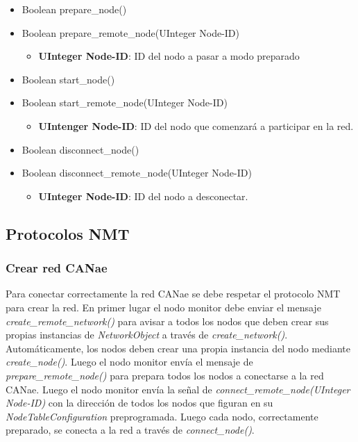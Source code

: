 \begin{itemize}
\item Boolean prepare\_node()
\item Boolean prepare\_remote\_node(UInteger Node-ID)
  \begin{itemize}
   \item \textbf{UInteger Node-ID}: ID del nodo a pasar a modo preparado
  \end{itemize}
\item Boolean start\_node()
\item Boolean start\_remote\_node(UInteger Node-ID)
  \begin{itemize}
    \item \textbf{UIntenger Node-ID}: ID del nodo que comenzará a participar en la red.
   \end{itemize}
\item Boolean disconnect\_node()
\item Boolean disconnect\_remote\_node(UInteger Node-ID)
  \begin{itemize}
    \item \textbf{UInteger Node-ID}: ID del nodo a desconectar.
  \end{itemize}
\end{itemize}

\subsection{Protocolos NMT}
\subsubsection{Crear red CANae}
Para conectar correctamente la red CANae se debe respetar el protocolo NMT para crear la red.
En primer lugar el nodo monitor debe enviar el mensaje \textit{create\_remote\_network()}
para avisar a todos los nodos que deben crear sus propias instancias de
\textit{NetworkObject} a través de \textit{create\_network()}. Automáticamente, los nodos deben crear una propia instancia del nodo mediante
\textit{create\_node()}. Luego el nodo monitor envía el mensaje de
\textit{prepare\_remote\_node()} para prepara todos los nodos a conectarse a la red CANae.
Luego el nodo monitor envía la señal de \textit{connect\_remote\_node(UInteger Node-ID)} con
la dirección de todos los nodos que figuran en su \textit{NodeTableConfiguration}
preprogramada.
Luego cada nodo, correctamente preparado, se conecta a la red a través de
\textit{connect\_node()}.

